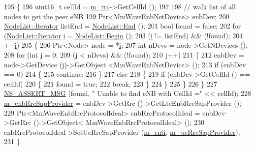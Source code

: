 \begin{DoxyCode}
195 \{
196   uint16\_t cellId = \hyperlink{classns3_1_1MmWaveUeRrcProtocolIdeal_a1e179281b6e70e0e08b240f8c2a28f68}{m\_rrc}->GetCellId ();  
197 
198   \textcolor{comment}{// walk list of all nodes to get the peer eNB}
199   Ptr<MmWaveEnbNetDevice> enbDev;
200   \hyperlink{classns3_1_1NodeList_a9e2679a94efb4f0066cc21e65440364d}{NodeList::Iterator} listEnd = \hyperlink{classns3_1_1NodeList_a027a558c16e6078e25c7ffc67becb559}{NodeList::End} ();
201   \textcolor{keywordtype}{bool} found = \textcolor{keyword}{false};
202   \textcolor{keywordflow}{for} (\hyperlink{classns3_1_1NodeList_a9e2679a94efb4f0066cc21e65440364d}{NodeList::Iterator} \hyperlink{bernuolliDistribution_8m_a6f6ccfcf58b31cb6412107d9d5281426}{i} = \hyperlink{classns3_1_1NodeList_a93d2211831f5cb71d1dbb721e2721d7f}{NodeList::Begin} (); 
203        (\hyperlink{bernuolliDistribution_8m_a6f6ccfcf58b31cb6412107d9d5281426}{i} != listEnd) && (!found); 
204        ++\hyperlink{bernuolliDistribution_8m_a6f6ccfcf58b31cb6412107d9d5281426}{i})
205     \{
206       Ptr<Node> node = *\hyperlink{bernuolliDistribution_8m_a6f6ccfcf58b31cb6412107d9d5281426}{i};
207       \textcolor{keywordtype}{int} nDevs = node->GetNDevices ();
208       \textcolor{keywordflow}{for} (\textcolor{keywordtype}{int} j = 0; 
209            (j < nDevs) && (!found);
210            j++)
211         \{
212           enbDev = node->GetDevice (j)->GetObject <MmWaveEnbNetDevice> ();
213           \textcolor{keywordflow}{if} (enbDev == 0)
214             \{
215               \textcolor{keywordflow}{continue};
216             \}
217           \textcolor{keywordflow}{else}
218             \{
219               \textcolor{keywordflow}{if} (enbDev->GetCellId () == cellId)
220                 \{
221                   found = \textcolor{keyword}{true};          
222                   \textcolor{keywordflow}{break};
223                 \}
224             \}
225         \}
226     \}
227   \hyperlink{assert_8h_aff5ece9066c74e681e74999856f08539}{NS\_ASSERT\_MSG} (found, \textcolor{stringliteral}{" Unable to find eNB with CellId ="} << cellId);
228   \hyperlink{classns3_1_1MmWaveUeRrcProtocolIdeal_aa5c51eb8a3949fe14f190c0890f79862}{m\_enbRrcSapProvider} = enbDev->GetRrc ()->GetLteEnbRrcSapProvider ();  
229   Ptr<MmWaveEnbRrcProtocolIdeal> enbRrcProtocolIdeal = enbDev->GetRrc ()->GetObject<
      MmWaveEnbRrcProtocolIdeal> ();
230   enbRrcProtocolIdeal->SetUeRrcSapProvider (\hyperlink{classns3_1_1MmWaveUeRrcProtocolIdeal_ad969a1d271c77ce56d83ec1db40bf5c9}{m\_rnti}, \hyperlink{classns3_1_1MmWaveUeRrcProtocolIdeal_a707bd4ca365ec4629c8dadc50493d12a}{m\_ueRrcSapProvider});
231 \}
\end{DoxyCode}


